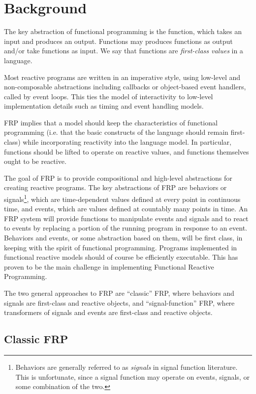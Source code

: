 \chapter{Background}
\label{chapter:Background}

The key abstraction of functional programming is the function, which takes an input and produces an output. Functions may produces functions
as output and/or take functions as input. We say that functions are {\em first-class values} in a language.

Most reactive programs are written in an imperative style, using low-level and non-composable abstractions including callbacks
or object-based event handlers, called by event loops. This ties the model of interactivity to low-level implementation details such as timing and event handling models. 

FRP implies that a model should keep the characteristics of functional programming (i.e. that the basic constructs of the language
should remain first-class) while incorporating reactivity into the language model. In particular, functions should be lifted to operate on reactive values,
and functions themselves ought to be reactive.

The goal of FRP is to provide compositional and high-level abstractions for creating reactive programs. The key
abstractions of FRP are behaviors or signals\footnote{Behaviors are generally referred to as {\em signals} in signal function literature. This is unfortunate, since a signal
function may operate on events, signals, or some combination of the two.}, which are time-dependent values defined at every point in continuous time, and events, which are 
values defined at countably many points in time. An FRP system will provide functions to manipulate events and signals and to react
to events by replacing a portion of the running program in response to an event. Behaviors and events, or some abstraction
based on them, will be first class, in keeping with the spirit of functional programming. Programs implemented in functional reactive
models should of course be efficiently executable. This has proven to be the main challenge in implementing Functional Reactive Programming.

The two general approaches to FRP are ``classic'' FRP, where behaviors and signals are first-class and reactive objects, and ``signal-function'' FRP,
where transformers of signals and events are first-class and reactive objects.

\section{Classic FRP}
\label{section:Background-Classic_FRP}

